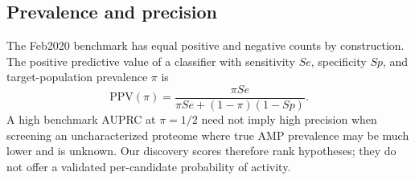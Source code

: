 \subsection{Prevalence and precision}
The Feb2020 benchmark has equal positive and negative counts by
construction. The positive predictive value of a classifier with sensitivity
$Se$, specificity $Sp$, and target-population prevalence $\pi$ is
\begin{equation}
\mathrm{PPV}(\pi) = \frac{\pi Se}{\pi Se + (1-\pi)(1-Sp)}.
\label{eq:ppv}
\end{equation}
A high benchmark AUPRC at $\pi=1/2$ need not imply high precision when
screening an uncharacterized proteome where true AMP prevalence may be much
lower and is unknown. Our discovery scores therefore rank hypotheses; they
do not offer a validated per-candidate probability of activity.
